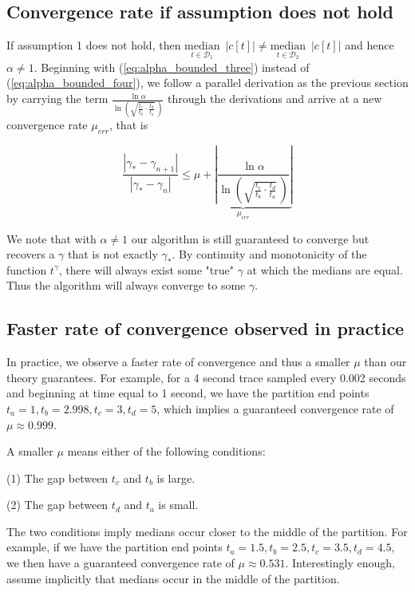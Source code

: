 \documentclass{segabs}
\newcommand{\truegamma}{\gamma_*}
\newcommand{\Done}{{\mathcal{D}_1}}
\newcommand{\Dtwo}{{\mathcal{D}_2}}
\newcommand{\undermedian}[2]{\underset{#1}{\text{median}}\,\,\,#2}
\newcommand{\scalefactor}{\ln \left(\sqrt{\frac{t_c}{t_b}\cdot\frac{t_d}{t_a}} \,\right) }
\begin{document}
\subsection{Convergence rate if assumption does not hold}

If  assumption 1 does not hold, then $ \undermedian{t \in \Done}{ |c[t]| }  \neq \undermedian{t \in \Dtwo}{|c[t]|}  
$ and hence $\alpha \neq 1$. Beginning with (\ref{eq:alpha_bounded_three}) instead of (\ref{eq:alpha_bounded_four}), we follow a parallel derivation as the previous section by carrying the term $\frac{\ln \alpha}{\scalefactor}$ through the derivations and arrive at a new convergence rate $\mu_{err}$, that is 

\begin{equation}
\frac{|\truegamma - \gamma_{n+1}|}{|\truegamma - \gamma_{n}|} \leq \underbrace{\mu + |\frac{\ln \alpha}{\scalefactor}|}_{\mu_{err}}
\end{equation}

We note that with $\alpha \neq 1$ our algorithm is still guaranteed to converge but recovers a  $\gamma$ that is not exactly $\truegamma$.  By continuity and monotonicity of the function $t^{\gamma}$, there will always exist some "true" $\gamma$ at which  the medians are equal. Thus the algorithm will always converge to some $\gamma$.

\subsection{Faster rate of convergence observed in practice}

In practice, we observe a faster rate of convergence and thus a smaller $\mu$ than our theory guarantees.  For example, for a 4 second trace sampled every 0.002 seconds and beginning at time equal to 1 second, we have the partition end points $t_a=1, t_b=2.998, t_c=3, t_d =5$, which implies a guaranteed convergence rate of $\mu \approx 0.999$.

A smaller $\mu$ means either of the following conditions:

(1) The gap between $t_c$ and $t_b$ is large. 

(2) The gap between $t_d$ and $t_a$ is small.
   
The two conditions imply medians occur closer to the middle of the partition.  For example, if we have the partition end points $t_a=1.5, t_b=2.5, t_c=3.5, t_d =4.5$, we then have a guaranteed convergence rate of $\mu \approx 0.531$. Interestingly enough,  \cite{Claerbout.sep.42.81} assume implicitly that medians occur in the middle of the partition.
\end{document}
